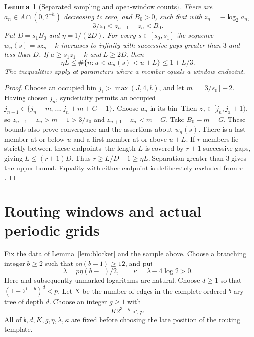 \documentclass[11pt]{article}
\newtheorem{lemma}[theorem]{Lemma}
\theoremstyle{definition}
\theoremstyle{remark}
\begin{document}
\begin{lemma}[Separated sampling and open-window counts]\label{lem:sampling}
There are $a_n\in A\cap(0,2^{-h})$ decreasing to zero, and $B_0>0$, such that
with $z_n=-\log_2 a_n$,
\begin{equation}\label{eq:loggaps}
 3/s_0<z_{n+1}-z_n<B_0.
\end{equation}
Put $D=s_1B_0$ and $\eta=1/(2D)$. For every $s\in[s_0,s_1]$ the sequence
$w_n(s)=s z_n-k$ increases to infinity with successive gaps greater than $3$
and less than $D$. If $u\geq s_1z_1-k$ and $L\geq2D$, then
\begin{equation}\label{eq:counts}
 \eta L\leq\#\{n:u<w_n(s)<u+L\}\leq1+L/3.
\end{equation}
The inequalities apply at parameters where a member equals a window endpoint.
\end{lemma}
\begin{proof}
Choose an occupied bin $j_1>\max(J,4,h)$, and let
$m=\lceil3/s_0\rceil+2$. Having chosen $j_n$, syndeticity permits an occupied
$j_{n+1}\in\{j_n+m,\ldots,j_n+m+G-1\}$. Choose $a_n$ in its bin.
Then $z_n\in[j_n,j_n+1)$, so
$z_{n+1}-z_n>m-1>3/s_0$ and $z_{n+1}-z_n<m+G$.
Take $B_0=m+G$. These bounds also prove convergence and the assertions about
$w_n(s)$. There is a last member at or below $u$ and a first member at or
above $u+L$. If $r$ members lie strictly between these endpoints, the length
$L$ is covered by $r+1$ successive gaps, giving $L\leq(r+1)D$.
Thus $r\geq L/D-1\geq\eta L$. Separation greater than $3$ gives the upper
bound. Equality with either endpoint is deliberately excluded from $r$.
\end{proof}

\section{Routing windows and actual periodic grids}\label{sec:routing}
Fix the data of Lemma~\ref{lem:blocker} and the sample above. Choose a branching
integer $b\geq2$ such that $p\eta(b-1)\geq12$, and put
\begin{equation}\label{eq:rates}
 \lambda=p\eta(b-1)/2,\qquad \kappa=\lambda-4\log2>0.
\end{equation}
Here and subsequently unmarked logarithms are natural. Choose $d\geq1$ so that
$(1-2^{1-b})^d<p$. Let $K$ be the number of edges in the complete ordered
$b$-ary tree of depth $d$. Choose an integer $g\geq1$ with
\begin{equation}\label{eq:stablecost}
 K2^{3-g}<p.
\end{equation}
All of $b,d,K,g,\eta,\lambda,\kappa$ are fixed before choosing the late
position of the routing template.
\end{document}
